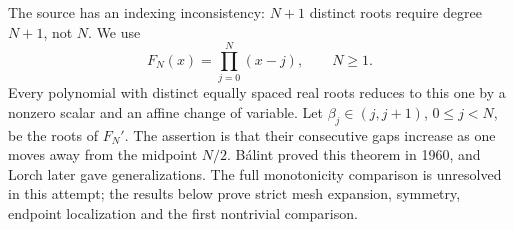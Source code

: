 The source has an indexing inconsistency: $N+1$ distinct roots require degree $N+1$, not $N$. We use
\[
 F_N(x)=\prod_{j=0}^{N}(x-j),\qquad N\ge1.
\]
Every polynomial with distinct equally spaced real roots reduces to this one by a nonzero scalar and an affine change of variable. Let $\beta_j\in(j,j+1)$, $0\le j<N$, be the roots of $F_N'$. The assertion is that their consecutive gaps increase as one moves away from the midpoint $N/2$.
B\'alint proved this theorem in 1960, and Lorch later gave generalizations. The full monotonicity comparison is unresolved in this attempt; the results below prove strict mesh expansion, symmetry, endpoint localization and the first nontrivial comparison.

